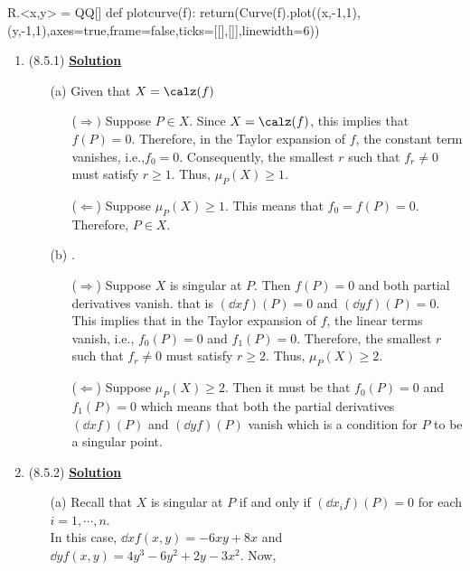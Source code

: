 \documentclass[11pt]{article}
\begin{document}
	
	\begin{sagesilent}
		R.<x,y> = QQ[]
		def plotcurve(f):
		return(Curve(f).plot((x,-1,1),(y,-1,1),axes=true,frame=false,ticks=[[],[]],linewidth=6))
	\end{sagesilent}
	
	
	\def\hwnum{14}
	\begin{enumerate}
		\item (8.5.1) 
		\textbf{\underline{Solution}}
		\begin{itemize}
			\item [(a)] Given that $X = \calz(f)$
			\begin{itemize}
				\item[($\Longrightarrow)$]Suppose $P \in X$. Since $X = \calz(f)$, this implies that $f(P) = 0$. Therefore, in the Taylor expansion of $f$, the constant term vanishes, i.e.,$f_0=0$. Consequently, the smallest $r$ such that $f_r \neq 0$ must satisfy $r \geq 1$. Thus, $\mu _P(X) \ge 1$.
				\item[($\Longleftarrow$)] Suppose $\mu _P(X) \ge 1$. This means that $f_0=f(P)=0$. Therefore, $P \in X$.
			\end{itemize}
			\item [(b)].
			\begin{itemize}
				\item [($\Longrightarrow$)] Suppose $X$ is singular at $P$. Then $f(P)=0 $ and both partial derivatives vanish. that is $(\dd {x}f)(P) = 0$ and $(\dd {y}f)(P) = 0$. This implies that in the Taylor expansion of $f$, the linear terms vanish, i.e., $f_0(P)=0 $ and $f_1(P)=0 $. Therefore, the smallest $r$ such that $f_r \neq 0$ must satisfy $r \geq 2$. Thus, $\mu _P(X) \ge 2$.
				\item[($\Longleftarrow$)] Suppose $\mu _P(X) \ge 2$. Then it must be that $f_0(P)=0 $ and $f_1(P)=0 $ which means that both the partial derivatives  $(\dd {x}f)(P) $ and $(\dd {y}f)(P)$ vanish which is a condition for $P$ to be a singular point.
			\end{itemize}
		\end{itemize}
		\item (8.5.2) 
		\textbf{\underline{Solution}}
		\begin{itemize}
			\item [(a)]Recall that $X$ is singular at $P$ if and only if $(\dd {x_i}f)(P) = 0$ for each $i = 1, \cdots , n$.\\
			In this case, $\dd {x}f(x,y) = -6xy + 8x$ and $\dd {y}f(x,y) = 4y^3 -6y^2 +2y -3x^2$. Now,
			\begin{align*}

\end{align*}
\end{itemize}
\end{enumerate}
\end{document}
